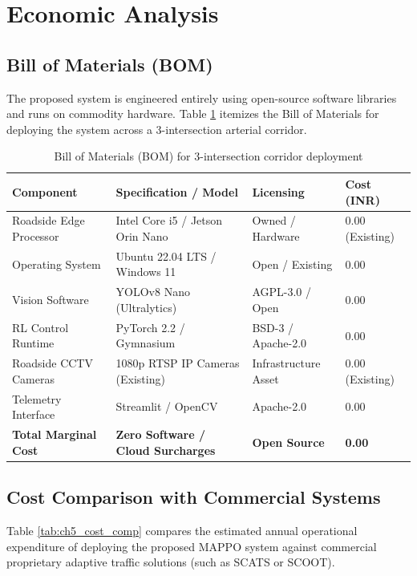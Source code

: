 \documentclass[12pt,a4paper,oneside]{report}
\begin{document}
\section{Economic Analysis}
\label{sec:ch5_economic_analysis}

\subsection{Bill of Materials (BOM)}
The proposed system is engineered entirely using open-source software libraries and runs on commodity hardware. Table \ref{tab:ch5_bom} itemizes the Bill of Materials for deploying the system across a 3-intersection arterial corridor.

\begin{table}[htbp]
\centering
\small
\caption{Bill of Materials (BOM) for 3-intersection corridor deployment}
\label{tab:ch5_bom}
\begin{tabularx}{\textwidth}{|p{3.8cm}|p{4.5cm}|p{3.2cm}|X|}
\hline
\textbf{Component} & \textbf{Specification / Model} & \textbf{Licensing} & \textbf{Cost (INR)} \\ \hline
Roadside Edge Processor & Intel Core i5 / Jetson Orin Nano & Owned / Hardware & 0.00 (Existing) \\ \hline
Operating System & Ubuntu 22.04 LTS / Windows 11 & Open / Existing & 0.00 \\ \hline
Vision Software & YOLOv8 Nano (Ultralytics) & AGPL-3.0 / Open & 0.00 \\ \hline
RL Control Runtime & PyTorch 2.2 / Gymnasium & BSD-3 / Apache-2.0 & 0.00 \\ \hline
Roadside CCTV Cameras & 1080p RTSP IP Cameras (Existing) & Infrastructure Asset & 0.00 (Existing) \\ \hline
Telemetry Interface & Streamlit / OpenCV & Apache-2.0 & 0.00 \\ \hline
\textbf{Total Marginal Cost} & \textbf{Zero Software / Cloud Surcharges} & \textbf{Open Source} & \textbf{0.00} \\ \hline
\end{tabularx}
\end{table}

\subsection{Cost Comparison with Commercial Systems}
Table \ref{tab:ch5_cost_comp} compares the estimated annual operational expenditure of deploying the proposed MAPPO system against commercial proprietary adaptive traffic solutions (such as SCATS or SCOOT).
\end{document}
